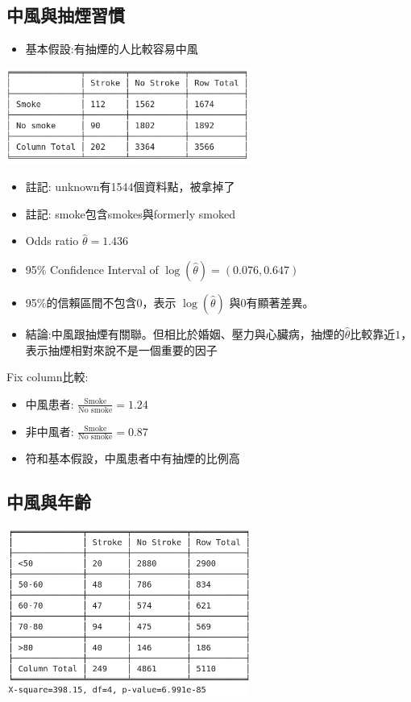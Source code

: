 \subsection{中風與抽煙習慣}
\begin{itemize}
    \item 基本假設:有抽煙的人比較容易中風
\end{itemize}
\begin{center}
    \includegraphics[width=8cm]{./two_by_two_table/smoke_stroke.png}
\end{center}
\begin{itemize}
    \item 註記: unknown有1544個資料點，被拿掉了
    \item 註記: smoke包含smokes與formerly smoked
    \item Odds ratio $\hat{\theta}=1.436$
    \item 95\% Confidence Interval of $\log{(\hat{\theta})}=(0.076, 0.647)$
    \item 95\%的信賴區間不包含0，表示 $\log{(\hat{\theta})}$ 與0有顯著差異。
    \item 結論:中風跟抽煙有關聯。但相比於婚姻、壓力與心臟病，抽煙的$\hat{\theta}$比較靠近$1$，表示抽煙相對來說不是一個重要的因子
\end{itemize}
Fix column比較:
\begin{itemize}
    \item 中風患者: $\frac{\text{Smoke}}{\text{No smoke}}=1.24$
    \item 非中風者: $\frac{\text{Smoke}}{\text{No smoke}}=0.87$
    \item 符和基本假設，中風患者中有抽煙的比例高
\end{itemize}

\subsection{中風與年齡}
\begin{center}
    \includegraphics[width=8cm]{./chisquare/age_stroke.png}
\end{center}

